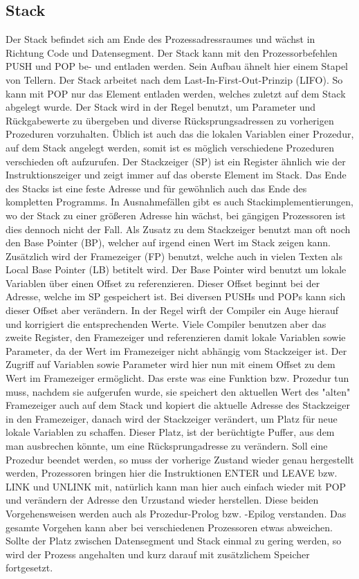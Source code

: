 ﻿\documentclass[12pt]{book}
\begin{document}
\subsection{Stack}
Der Stack befindet sich am Ende des Prozessadressraumes und wächst in Richtung
Code und Datensegment. Der Stack kann mit den Prozessorbefehlen PUSH und POP be-
und entladen werden. Sein Aufbau ähnelt hier einem Stapel von Tellern. Der Stack
arbeitet nach dem Last-In-First-Out-Prinzip (LIFO). So kann mit POP nur das
Element entladen werden, welches zuletzt auf dem Stack abgelegt wurde. Der Stack
wird in der Regel benutzt, um Parameter und Rückgabewerte zu übergeben und
diverse Rücksprungsadressen zu vorherigen Prozeduren vorzuhalten. Üblich ist
auch das die lokalen Variablen einer Prozedur, auf dem Stack angelegt werden,
somit ist es möglich verschiedene Prozeduren verschieden oft aufzurufen. Der
Stackzeiger (SP) ist ein Register ähnlich wie der Instruktionszeiger und zeigt
immer auf das oberste Element im Stack. Das Ende des Stacks ist eine feste
Adresse und für gewöhnlich auch das Ende des kompletten Programms. In
Ausnahmefällen gibt es auch Stackimplementierungen, wo der Stack zu einer
größeren Adresse hin wächst, bei gängigen Prozessoren ist dies dennoch nicht der
Fall. Als Zusatz zu dem Stackzeiger benutzt man oft noch den Base Pointer (BP),
welcher auf irgend einen Wert im Stack zeigen kann. Zusätzlich wird der
Framezeiger (FP) benutzt, welche auch in vielen Texten als Local Base Pointer
(LB) betitelt wird. Der Base Pointer wird benutzt um lokale Variablen über einen
Offset zu referenzieren. Dieser Offset beginnt bei der Adresse, welche im SP
gespeichert ist. Bei diversen PUSHs und POPs kann sich dieser Offset aber
verändern. In der Regel wirft der Compiler ein Auge hierauf und korrigiert die
entsprechenden Werte. Viele Compiler benutzen aber das zweite Register, den
Framezeiger und referenzieren damit lokale Variablen sowie Parameter, da der
Wert im Framezeiger nicht abhängig vom Stackzeiger ist. Der Zugriff auf
Variablen sowie Parameter wird hier nun mit einem Offset zu dem Wert im
Framezeiger ermöglicht. Das erste was eine Funktion bzw. Prozedur tun muss,
nachdem sie aufgerufen wurde, sie speichert den aktuellen Wert des "alten"
Framezeiger auch auf dem Stack und kopiert die aktuelle Adresse des Stackzeiger
in den Framezeiger, danach wird der Stackzeiger verändert, um Platz für neue
lokale Variablen zu schaffen. Dieser Platz, ist der berüchtigte Puffer, aus dem
man ausbrechen könnte, um eine Rücksprungadresse zu verändern. Soll eine
Prozedur beendet werden, so muss der vorherige Zustand wieder genau hergestellt
werden, Prozessoren bringen hier die Instruktionen ENTER und LEAVE bzw. LINK und
UNLINK mit, natürlich kann man hier auch einfach wieder mit POP und verändern
der Adresse den Urzustand wieder herstellen. Diese beiden Vorgehensweisen werden
auch als Prozedur-Prolog bzw. -Epilog verstanden. Das gesamte Vorgehen kann aber
bei verschiedenen Prozessoren etwas abweichen. Sollte der Platz zwischen
Datensegment und Stack einmal zu gering werden, so wird der Prozess angehalten
und kurz darauf mit zusätzlichem Speicher fortgesetzt.
\end{document}
